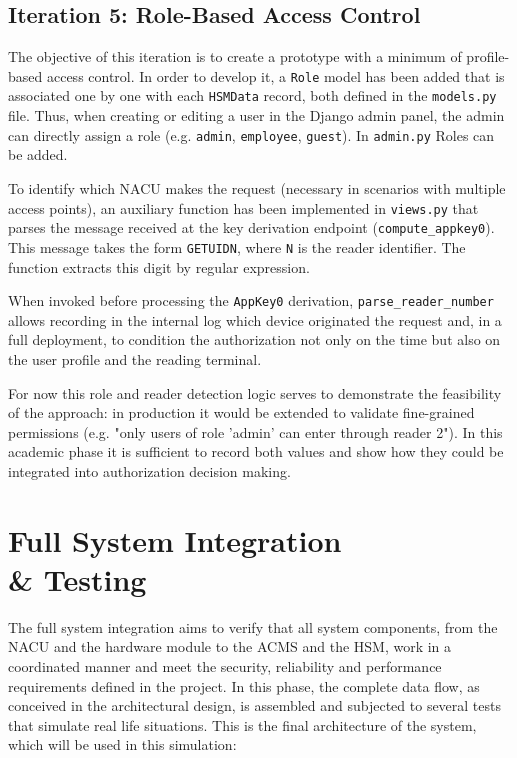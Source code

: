 \subsection{Iteration 5: Role-Based Access Control}
\label{subsec:roles}

The objective of this iteration is to create a prototype with a minimum of profile-based access control. In order to develop it, a \texttt{Role} model has been added that is associated one by one with each \texttt{HSMData} record, both defined in the \texttt{models.py} file. Thus, when creating or editing a user in the Django admin panel, the admin can directly assign a role (e.g. \texttt{admin}, \texttt{employee}, \texttt{guest}). In \texttt{admin.py} Roles can be added.

To identify which NACU makes the request (necessary in scenarios with multiple access points), an auxiliary function has been implemented in \texttt{views.py} that parses the message received at the key derivation endpoint (\texttt{compute\_appkey0}). This message takes the form \texttt{GETUIDN}, where \texttt{N} is the reader identifier. The function extracts this digit by regular expression.

When invoked before processing the \texttt{AppKey0} derivation, \texttt{parse\_reader\_number} allows recording in the internal log which device originated the request and, in a full deployment, to condition the authorization not only on the time but also on the user profile and the reading terminal.

For now this role and reader detection logic serves to demonstrate the feasibility of the approach: in production it would be extended to validate fine-grained permissions (e.g. "only users of role 'admin' can enter through reader 2"). In this academic phase it is sufficient to record both values and show how they could be integrated into authorization decision making.

\section{Full System Integration \\ \& Testing}

The full system integration aims to verify that all system components, from the NACU and the hardware module to the ACMS and the HSM, work in a coordinated manner and meet the security, reliability and performance requirements defined in the project. In this phase, the complete data flow, as conceived in the architectural design, is assembled and subjected to several tests that simulate real life situations. This is the final architecture of the system, which will be used in this simulation:


